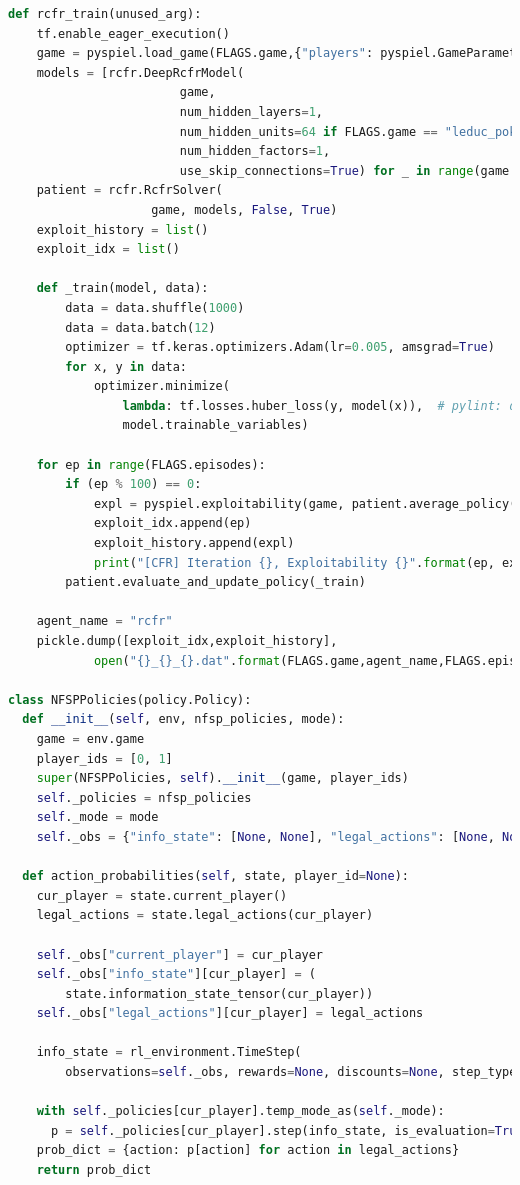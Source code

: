 \documentclass[10pt,a4paper]{article}
\begin{document}
\begin{lstlisting}[language=Python]
def rcfr_train(unused_arg):
    tf.enable_eager_execution()
    game = pyspiel.load_game(FLAGS.game,{"players": pyspiel.GameParameter(2)})
    models = [rcfr.DeepRcfrModel(
                        game,
                        num_hidden_layers=1,
                        num_hidden_units=64 if FLAGS.game == "leduc_poker" else 13,
                        num_hidden_factors=1,
                        use_skip_connections=True) for _ in range(game.num_players())]
    patient = rcfr.RcfrSolver(
                    game, models, False, True)
    exploit_history = list()
    exploit_idx = list()

    def _train(model, data):
        data = data.shuffle(1000)
        data = data.batch(12)
        optimizer = tf.keras.optimizers.Adam(lr=0.005, amsgrad=True)    
        for x, y in data:
            optimizer.minimize(
                lambda: tf.losses.huber_loss(y, model(x)),  # pylint: disable=cell-var-from-loop
                model.trainable_variables)

    for ep in range(FLAGS.episodes):
        if (ep % 100) == 0:
            expl = pyspiel.exploitability(game, patient.average_policy())
            exploit_idx.append(ep)
            exploit_history.append(expl)
            print("[CFR] Iteration {}, Exploitability {}".format(ep, expl))
        patient.evaluate_and_update_policy(_train)

    agent_name = "rcfr"
    pickle.dump([exploit_idx,exploit_history],
            open("{}_{}_{}.dat".format(FLAGS.game,agent_name,FLAGS.episodes),"wb")) 

class NFSPPolicies(policy.Policy):
  def __init__(self, env, nfsp_policies, mode):
    game = env.game
    player_ids = [0, 1]
    super(NFSPPolicies, self).__init__(game, player_ids)
    self._policies = nfsp_policies
    self._mode = mode
    self._obs = {"info_state": [None, None], "legal_actions": [None, None]}

  def action_probabilities(self, state, player_id=None):
    cur_player = state.current_player()
    legal_actions = state.legal_actions(cur_player)

    self._obs["current_player"] = cur_player
    self._obs["info_state"][cur_player] = (
        state.information_state_tensor(cur_player))
    self._obs["legal_actions"][cur_player] = legal_actions

    info_state = rl_environment.TimeStep(
        observations=self._obs, rewards=None, discounts=None, step_type=None)

    with self._policies[cur_player].temp_mode_as(self._mode):
      p = self._policies[cur_player].step(info_state, is_evaluation=True).probs
    prob_dict = {action: p[action] for action in legal_actions}
    return prob_dict
\end{lstlisting}
\end{document}
